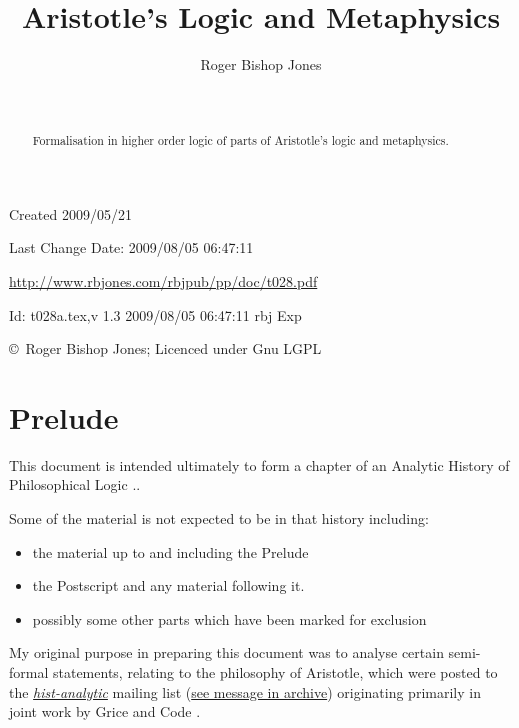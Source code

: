 \documentclass[11pt]{article}
\title{Aristotle's Logic and Metaphysics}
\author{Roger Bishop Jones}
\date{\ }
\begin{document}
\begin{titlepage}
\maketitle
\begin{abstract}
Formalisation in higher order logic of parts of Aristotle's logic and metaphysics.
\end{abstract}
\vfill

\begin{centering}
{\footnotesize

Created 2009/05/21

Last Change $ $Date: 2009/08/05 06:47:11 $ $

\href{http://www.rbjones.com/rbjpub/pp/doc/t028.pdf}
{http://www.rbjones.com/rbjpub/pp/doc/t028.pdf}

$ $Id: t028a.tex,v 1.3 2009/08/05 06:47:11 rbj Exp $ $

\copyright\ Roger Bishop Jones; Licenced under Gnu LGPL

}%
\end{centering}

\thispagestyle{empty}
\end{titlepage}

\newpage
\addtocounter{page}{1}
{\parskip=0pt\tableofcontents}

\section{Prelude}

This document is intended ultimately to form a chapter of an Analytic History of Philosophical Logic \cite{rbjb001}..

Some of the material is not expected to be in that history including:
\begin{itemize}
\item the material up to and including the Prelude
\item the Postscript and any material following it.
\item possibly some other parts which have been marked for exclusion
\end{itemize}

My original purpose in preparing this document was to analyse certain semi-formal statements, relating to the philosophy of Aristotle, which were posted to the \href{http://hist-analytic.org}{\it hist-analytic} mailing list (\href{http://rbjones.com/pipermail/hist-analytic_rbjones.com/2009q2/000258.html}{see message in archive}) originating primarily in joint work by Grice \cite{grice88} and Code \cite{code88}.
\end{document}
